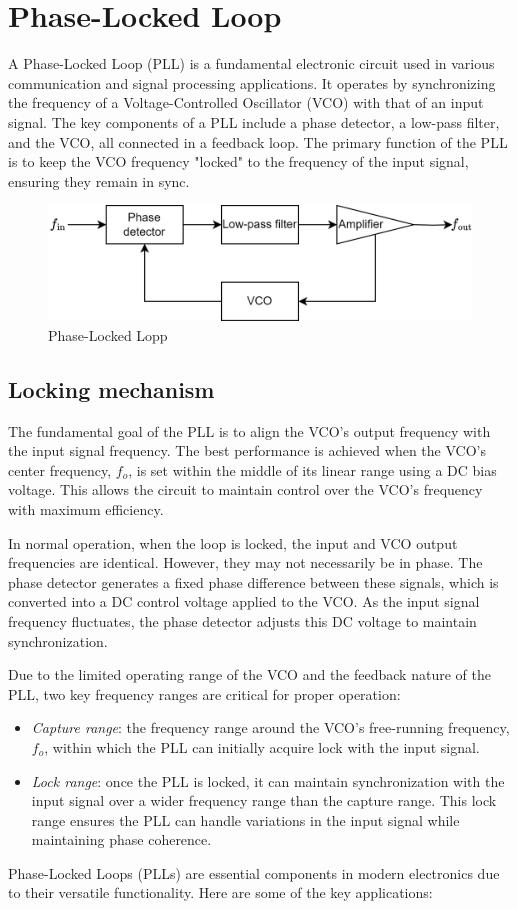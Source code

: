 \section{Phase-Locked Loop}

A Phase-Locked Loop (PLL) is a fundamental electronic circuit used in various communication and signal processing applications.
It operates by synchronizing the frequency of a Voltage-Controlled Oscillator (VCO) with that of an input signal.
The key components of a PLL include a phase detector, a low-pass filter, and the VCO, all connected in a feedback loop. 
The primary function of the PLL is to keep the VCO frequency "locked" to the frequency of the input signal, ensuring they remain in sync.
\begin{figure}[H]
    \centering
    \includegraphics[width=0.75\linewidth]{images/pll.png}
    \caption{Phase-Locked Lopp}
\end{figure}

\subsection{Locking mechanism}
The fundamental goal of the PLL is to align the VCO's output frequency with the input signal frequency. 
The best performance is achieved when the VCO's center frequency, $f_{{o}}$, is set within the middle of its linear range using a DC bias voltage.
This allows the circuit to maintain control over the VCO's frequency with maximum efficiency.

In normal operation, when the loop is locked, the input and VCO output frequencies are identical. 
However, they may not necessarily be in phase. 
The phase detector generates a fixed phase difference between these signals, which is converted into a DC control voltage applied to the VCO. 
As the input signal frequency fluctuates, the phase detector adjusts this DC voltage to maintain synchronization.

Due to the limited operating range of the VCO and the feedback nature of the PLL, two key frequency ranges are critical for proper operation:
\begin{itemize}
    \item \textit{Capture range}: the frequency range around the VCO's free-running frequency, $f_{{o}}$, within which the PLL can initially acquire lock with the input signal.
    \item \textit{Lock range}: once the PLL is locked, it can maintain synchronization with the input signal over a wider frequency range than the capture range. 
        This lock range ensures the PLL can handle variations in the input signal while maintaining phase coherence.
\end{itemize}
Phase-Locked Loops (PLLs) are essential components in modern electronics due to their versatile functionality. 
Here are some of the key applications:

